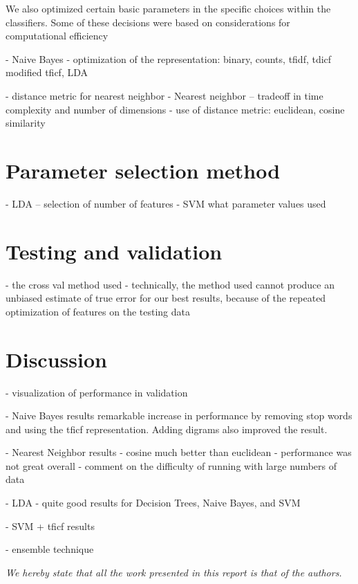 \documentclass[conference,letterpaper]{IEEEtran}
\begin{document}
We also optimized certain basic parameters in the specific choices within the classifiers.  Some of these 
decisions were based on considerations for computational efficiency

- Naive Bayes 
	- optimization of the representation: binary, counts, tfidf, tdicf
		modified tficf, LDA

- distance metric for nearest neighbor
- Nearest neighbor -- tradeoff in time complexity and number of dimensions
	- use of distance metric: euclidean, cosine similarity

\section{Parameter selection method}
- LDA -- selection of number of features
- SVM what parameter values used



\section{Testing and validation}
- the cross val method used
- technically, the method used cannot produce an unbiased estimate of true
	error for our best results, because of the repeated optimization
	of features on the testing data


\section{Discussion}

- visualization of performance in validation

- Naive Bayes results
	remarkable increase in performance by removing stop words and using the
	tficf representation.  Adding digrams also improved the result.

- Nearest Neighbor results
	- cosine much better than euclidean
	- performance was not great overall
	- comment on the difficulty of running with large numbers of data

- LDA
	- quite good results for Decision Trees, Naive Bayes, and SVM

- SVM + tficf results

- ensemble technique

\begin{center}
	\textit{
		We hereby state that all the work presented in this report is 
		that of the authors.
	}
\end{center}


\end{document}
